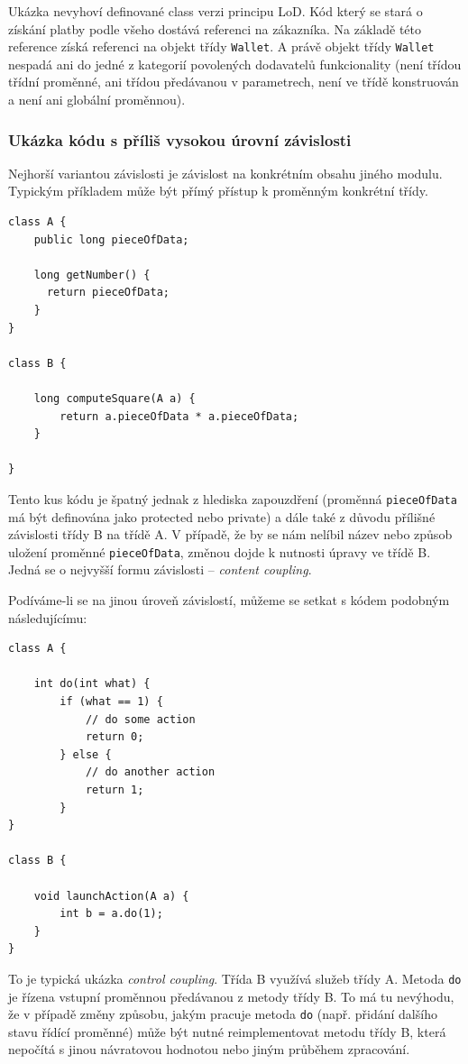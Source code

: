 Ukázka nevyhoví definované class verzi principu LoD. Kód který se stará o získání platby podle všeho dostává referenci na zákazníka. Na základě této reference získá referenci na objekt třídy \verb+Wallet+. A právě objekt třídy \verb+Wallet+ nespadá ani do jedné z kategorií povolených dodavatelů funkcionality (není třídou třídní proměnné, ani třídou předávanou v parametrech, není ve třídě konstruován a není ani globální proměnnou).

\subsubsection{Ukázka kódu s příliš vysokou úrovní závislosti}
Nejhorší variantou závislosti je závislost na konkrétním obsahu jiného modulu. Typickým příkladem může být přímý přístup k proměnným konkrétní třídy.

\begin{lstlisting}
class A {
    public long pieceOfData;

    long getNumber() {
      return pieceOfData;
    }
}

class B {

    long computeSquare(A a) {
        return a.pieceOfData * a.pieceOfData;
    }

}
\end{lstlisting}

Tento kus kódu je špatný jednak z hlediska zapouzdření (proměnná \verb+pieceOfData+ má být definována jako protected nebo private) a dále také z důvodu přílišné závislosti třídy B na třídě A. V případě, že by se nám nelíbil název nebo způsob uložení proměnné \verb+pieceOfData+, změnou dojde k nutnosti úpravy ve třídě B. Jedná se o nejvyšší formu závislosti -- \emph{content coupling}.

Podíváme-li se na jinou úroveň závislostí, můžeme se setkat s kódem podobným následujícímu:

\begin{lstlisting}
class A {

    int do(int what) {
        if (what == 1) {
            // do some action
            return 0;
        } else {
            // do another action
            return 1;
        }
}

class B {

    void launchAction(A a) {
        int b = a.do(1);
    }
}
\end{lstlisting}

To je typická ukázka \emph{control coupling}. Třída B využívá služeb třídy A. Metoda \verb+do+ je řízena vstupní proměnnou předávanou z metody třídy B. To má tu nevýhodu, že v případě změny způsobu, jakým pracuje metoda \verb+do+ (např. přidání dalšího stavu řídící proměnné) může být nutné reimplementovat metodu třídy B, která nepočítá s jinou návratovou hodnotou nebo jiným průběhem zpracování.

